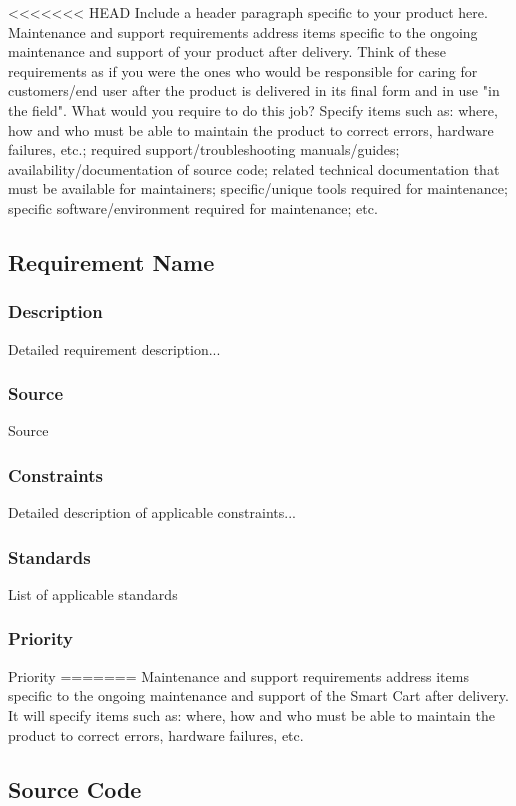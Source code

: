 <<<<<<< HEAD
Include a header paragraph specific to your product here. Maintenance and support requirements address items specific to the ongoing maintenance and support of your product after delivery. Think of these requirements as if you were the ones who would be responsible for caring for customers/end user after the product is delivered in its final form and in use "in the field". What would you require to do this job? Specify items such as: where, how and who must be able to maintain the product to correct errors, hardware failures, etc.; required support/troubleshooting manuals/guides; availability/documentation of source code; related technical documentation that must be available for maintainers; specific/unique tools required for maintenance; specific software/environment required for maintenance; etc.

\subsection{Requirement Name}
\subsubsection{Description}
Detailed requirement description...
\subsubsection{Source}
Source
\subsubsection{Constraints}
Detailed description of applicable constraints...
\subsubsection{Standards}
List of applicable standards
\subsubsection{Priority}
Priority
=======
Maintenance and support requirements address items specific to the ongoing maintenance and support of the Smart Cart after delivery. It will specify items such as: where, how and who must be able to maintain the product to correct errors, hardware failures, etc.

\subsection{Source Code}

